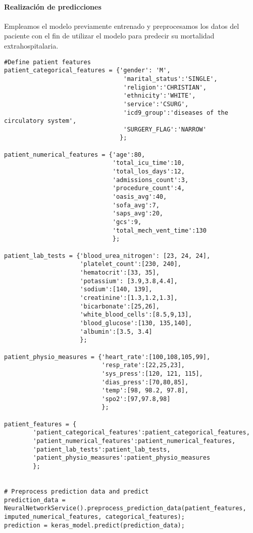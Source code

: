 \documentclass{report}
\begin{document}
\paragraph{Realización de predicciones}

Empleamos el modelo previamente entrenado y preprocesamos los datos del paciente con el fin de utilizar el modelo para predecir su mortalidad extrahospitalaria.

\begin{verbatim}
#Define patient features
patient_categorical_features = {'gender': 'M',
                                 'marital_status':'SINGLE',
                                 'religion':'CHRISTIAN',
                                 'ethnicity':'WHITE',
                                 'service':'CSURG',
                                 'icd9_group':'diseases of the circulatory system',
                                 'SURGERY_FLAG':'NARROW'
                                };
                                
patient_numerical_features = {'age':80,
                              'total_icu_time':10,
                              'total_los_days':12,
                              'admissions_count':3,
                              'procedure_count':4,
                              'oasis_avg':40,
                              'sofa_avg':7,
                              'saps_avg':20,
                              'gcs':9,
                              'total_mech_vent_time':130
                              };

patient_lab_tests = {'blood_urea_nitrogen': [23, 24, 24],
                     'platelet_count':[230, 240],
                     'hematocrit':[33, 35],
                     'potassium': [3.9,3.8,4.4],
                     'sodium':[140, 139],
                     'creatinine':[1.3,1.2,1.3],
                     'bicarbonate':[25,26],
                     'white_blood_cells':[8.5,9,13],
                     'blood_glucose':[130, 135,140],
                     'albumin':[3.5, 3.4]
                     };

patient_physio_measures = {'heart_rate':[100,108,105,99],
                           'resp_rate':[22,25,23],
                           'sys_press':[120, 121, 115],
                           'dias_press':[70,80,85],
                           'temp':[98, 98.2, 97.8],
                           'spo2':[97,97.8,98]
                           };

patient_features = {
        'patient_categorical_features':patient_categorical_features,
        'patient_numerical_features':patient_numerical_features,
        'patient_lab_tests':patient_lab_tests,
        'patient_physio_measures':patient_physio_measures
        };


# Preprocess prediction data and predict
prediction_data = NeuralNetworkService().preprocess_prediction_data(patient_features, imputed_numerical_features, categorical_features);
prediction = keras_model.predict(prediction_data);

\end{verbatim}
\end{document}
